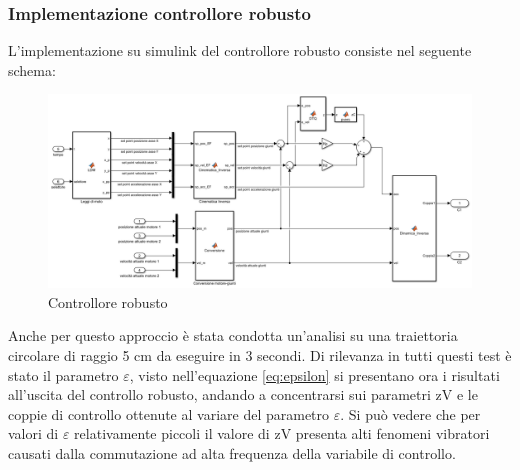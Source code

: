\subsubsection*{Implementazione controllore robusto}
L'implementazione su simulink del controllore robusto consiste nel seguente schema: 
\begin{figure}[ht]
	\begin{center}
		\includegraphics[scale=0.5]{Immagini/Controllori/RobustSchema}
		\caption{Controllore robusto}
		\label{fig:robustSchema}
	\end{center}
\end{figure}
Anche per questo approccio è stata condotta un'analisi su una traiettoria circolare di raggio 5 cm da eseguire in 3 secondi. Di rilevanza in tutti questi test è stato il parametro $\varepsilon$, visto nell'equazione \ref{eq:epsilon} si presentano ora i risultati all'uscita del controllo robusto, andando a concentrarsi sui parametri zV e le coppie di controllo ottenute al variare del parametro $\varepsilon$.
Si può vedere che per valori di $\varepsilon$ relativamente piccoli il valore di zV presenta alti fenomeni vibratori causati dalla commutazione ad alta frequenza della variabile di controllo.
